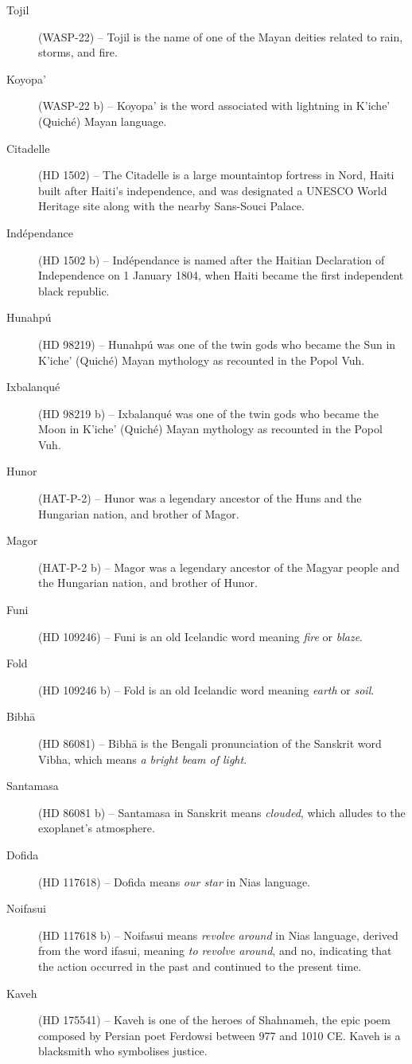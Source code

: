 \begin{description}
\item[Tojil] (WASP-22) -- Tojil is the name of one of the Mayan deities related to rain, storms, and fire.
\item[Koyopa'] (WASP-22 b) -- Koyopa' is the word associated with lightning in K'iche' (Quiché) Mayan language.
\item[Citadelle] (HD 1502) -- The Citadelle is a large mountaintop fortress in Nord, Haiti built after Haiti's independence, and was designated a UNESCO World Heritage site along with the nearby Sans-Souci Palace.
\item[Indépendance] (HD 1502 b) -- Indépendance is named after the Haitian Declaration of Independence on 1 January 1804, when Haiti became the first independent black republic.
\item[Hunahpú] (HD 98219) -- Hunahpú was one of the twin gods who became the Sun in K'iche' (Quiché) Mayan mythology as recounted in the Popol Vuh.
\item[Ixbalanqué] (HD 98219 b) -- Ixbalanqué was one of the twin gods who became the Moon in K'iche' (Quiché) Mayan mythology as recounted in the Popol Vuh.
\item[Hunor] (HAT-P-2) -- Hunor was a legendary ancestor of the Huns and the Hungarian nation, and brother of Magor.
\item[Magor] (HAT-P-2 b) -- Magor was a legendary ancestor of the Magyar people and the Hungarian nation, and brother of Hunor.
\item[Funi] (HD 109246) -- Funi is an old Icelandic word meaning \textit{fire} or \textit{blaze}.
\item[Fold] (HD 109246 b) -- Fold is an old Icelandic word meaning \textit{earth} or \textit{soil}.
\item[Bibhā] (HD 86081) -- Bibhā is the Bengali pronunciation of the Sanskrit word Vibha, which means \textit{a bright beam of light}.
\item[Santamasa] (HD 86081 b) -- Santamasa in Sanskrit means \textit{clouded}, which alludes to the exoplanet’s atmosphere.
\item[Dofida] (HD 117618) -- Dofida means \textit{our star} in Nias language.
\item[Noifasui] (HD 117618 b) -- Noifasui means \textit{revolve around} in Nias language, derived from the word ifasui, meaning \textit{to revolve around}, and no, indicating that the action occurred in the past and continued to the present time.
\item[Kaveh] (HD 175541) -- Kaveh is one of the heroes of Shahnameh, the epic poem composed by Persian poet Ferdowsi between 977 and 1010 CE. Kaveh is a blacksmith who symbolises justice.

\end{description}
